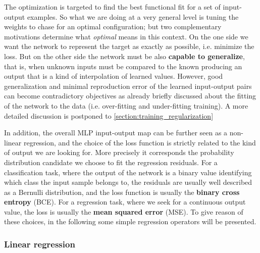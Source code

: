The optimization is targeted to find the best functional fit for a set of input-output examples. So what we are doing at a very general level is tuning the weights to chase for an optimal configuration; but two complementary motivations determine what \textit{optimal} means in this context. On the one side we want the network to represent the target as exactly as possible, i.e. minimize the loss. But on the other side the network must be also \textbf{capable to generalize}, that is, when unknown inputs must be compared to the known producing an output that is a kind of interpolation of learned values. However, good generalization and minimal reproduction error of the learned input-output pairs can become contradictory objectives as already briefly discussed about the fitting of the network to the data (i.e. over-fitting and under-fitting training).
A more detailed discussion is postponed to \cref{section:training_regularization}

In addition, the overall \acs{MLP} input-output map can be further seen as a non-linear regression, and the choice of the loss function is strictly related to the kind of output we are looking for. More precisely it corresponds the probability distribution candidate we choose to fit the regression residuals. For a classification task, where the output of the network is a binary value identifying which class the input sample belongs to, the residuals are usually well described as a Bernulli distribution, and the loss function is usually the \textbf{binary cross entropy} (BCE). For a regression task, where we seek for a continuous output value, the loss is usually the \textbf{mean squared error} (MSE).
%
To give reason of these choices, in the following some simple regression operators will be presented.

\subsubsection{Linear regression}

